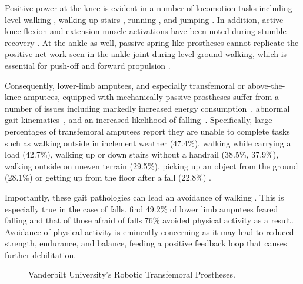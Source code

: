 Positive power at the knee is evident in a number of locomotion tasks including
level walking \citep{perry1992gait}, walking up stairs
\citep{nadeau2003frontal}, running \citep{buczek1990stance}, and jumping
\citep{hubley1983work}. In addition, active knee flexion and extension muscle
activations have been noted during stumble recovery \citep{eng1994strategies}.
At the ankle as well, passive spring-like prostheses cannot replicate the
positive net work seen in the ankle joint during level ground walking, which is
essential for push-off and forward propulsion \citep{perry1992gait}.

Consequently, lower-limb amputees, and especially transfemoral or above-the-knee
amputees, equipped with mechanically-passive prostheses suffer from a number of
issues including markedly increased energy consumption~\citep{waters1976energy},
abnormal gait kinematics~\citep{jaegers1995prosthetic}, and an increased
likelihood of falling~\citep{miller2001prevalence}. Specifically, large
percentages of transfemoral amputees report they are unable to complete tasks
such as walking outside in inclement weather (47.4\%), walking while carrying a
load (42.7\%), walking up or down stairs without a handrail (38.5\%, 37.9\%),
walking outside on uneven terrain (29.5\%), picking up an object from the ground
(28.1\%) or getting up from the floor after a fall (22.8\%)
\citep{gauthier1999enabling}.

Importantly, these gait pathologies can lead an avoidance of walking
\citep{gauthier1999enabling}. This is especially true in the case of falls.
\citet{miller2001prevalence} find 49.2\% of lower limb amputees feared falling
and that of those afraid of falls 76\% avoided physical activity as a result.
Avoidance of physical activity is eminently concerning as it may lead to reduced
strength, endurance, and balance, feeding a positive feedback loop that causes
further debilitation.

\begin{figure*}[b]
    \centering



    \caption{Vanderbilt University's Robotic Transfemoral
    Prostheses.\label{fig:vanderbilt_prostheses}}
\end{figure*}


